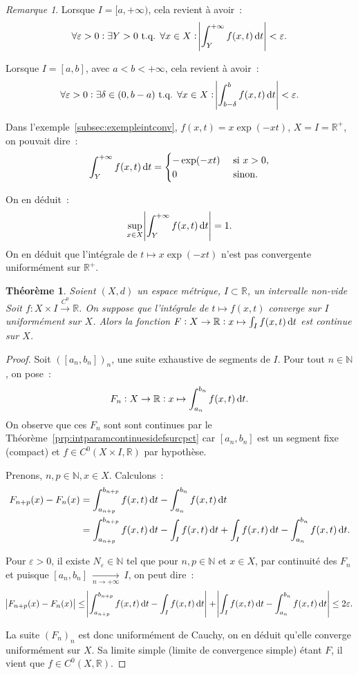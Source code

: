 \documentclass{report}
\newtheorem{thm}{Théorème}[chapter]
\theoremstyle{definition}
\theoremstyle{remark}
\newtheorem*{rmq}{Remarque}
\newcommand{\R}{\mathbb R}
\newcommand{\Rp}{\R^{+}}
\newcommand{\N}{\mathbb N}
\newcommand{\tq}{\text{ t.q. }}
\newcommand{\toC}[1]{\xrightarrow{C^{#1}}}
\newcommand{\tocont}{\toC 0}
\newcommand{\pinfty}{{+\infty}}
\begin{document}
			\begin{rmq} Lorsque $I = [a, \pinfty)$, cela revient à avoir~:
			\[\forall \varepsilon > 0 : \exists Y > 0 \tq \forall x \in X : \abs {\int_Y^\pinfty f(x, t)\dif t} < \varepsilon.\]

			Lorsque $I = [a, b]$, avec $a < b < \pinfty$, cela revient à avoir~:
			\[\forall \varepsilon > 0 : \exists \delta \in (0, b-a) \tq \forall x \in X : \abs {\int_{b-\delta}^bf(x, t)\dif t} < \varepsilon.\]

			Dans l'exemple~\ref{subsec:exempleintconv}, $f(x, t) = x\exp(-xt)$, $X = I = \Rp$, on pouvait dire~:
			\[\int_Y^\pinfty f(x, t)\dif t = \begin{cases}-\exp(-xt) &\text{ si } x > 0, \\0 &\text{ sinon}.\end{cases}\]

			On en déduit~:
			\[\sup_{x \in X}\abs {\int_Y^\pinfty f(x, t)\dif t} = 1.\]
			On en déduit que l'intégrale de $t \mapsto x\exp(-xt)$ n'est pas convergente uniformément sur $\Rp$.
			\end{rmq}

			\begin{thm} Soient $(X, d)$ un espace métrique, $I \subset \R$, un intervalle non-vide Soit $f : X \times I \tocont \R$. On suppose que l'intégrale
			de $t \mapsto f(x, t)$ converge sur $I$ uniformément sur $X$. Alors la fonction $F : X \to \R : x \mapsto \int_I f(x, t)\dif t$ est continue sur $X$.
			\end{thm}

			\begin{proof} Soit $([a_n, b_n])_n$, une suite exhaustive de segments de $I$. Pour tout $n \in \N$, on pose~:
			\[F_n : X \to \R : x \mapsto \int_{a_n}^{b_n}f(x, t)\dif t.\]
			On observe que ces $F_n$ sont sont continues par le Théorème~\ref{prp:intparamcontinuesidefsurcpct} car $[a_n, b_n]$ est un segment fixe (compact)
			et $f \in C^0(X \times I, \R)$ par hypothèse.

			Prenons, $n, p \in \N, x \in X$. Calculons~:
			\begin{align*}
				F_{n+p}(x) - F_n(x) &= \int_{a_{n+p}}^{b_{n+p}}f(x, t)\dif t - \int_{a_n}^{b_n}f(x, t)\dif t \\
				&= \int_{a_{n+p}}^{b_{n+p}}f(x, t)\dif t - \int_If(x, t)\dif t + \int_If(x, t)\dif t - \int_{a_n}^{b_n}f(x, t)\dif t.
			\end{align*}

			Pour $\varepsilon > 0$, il existe $N_\varepsilon \in \N$ tel que pour $n, p \in \N$ et $x \in X$, par continuité des $F_n$ et puisque
			$[a_n, b_n]~\xrightarrow[n \to \pinfty]{}~I$, on peut dire~:
			\[\abs {F_{n+p}(x) - F_n(x)}
				\leq \abs {\int_{a_{n+p}}^{b_{n+p}}f(x, t)\dif t - \int_If(x, t)\dif t} + \abs {\int_If(x, t)\dif t - \int_{a_n}^{b_n}f(x, t)\dif t}
				\leq 2\varepsilon.\]

			La suite $(F_n)_n$ est donc uniformément de Cauchy, on en déduit qu'elle converge uniformément sur $X$. Sa limite simple (limite de convergence
			simple) étant $F$, il vient que $f \in C^0(X, \R)$.
			\end{proof}
\end{document}
